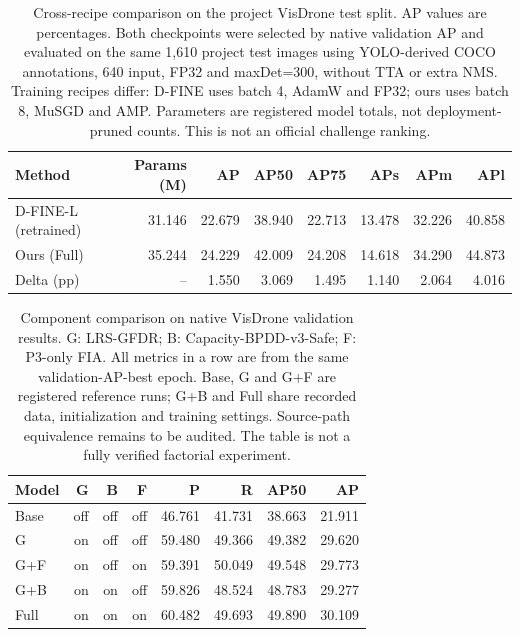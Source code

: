 
\begin{table}[t]
\centering
\small
\caption{Cross-recipe comparison on the project VisDrone test split. AP values are percentages. Both checkpoints were selected by native validation AP and evaluated on the same 1,610 project test images using YOLO-derived COCO annotations, 640 input, FP32 and maxDet=300, without TTA or extra NMS. Training recipes differ: D-FINE uses batch 4, AdamW and FP32; ours uses batch 8, MuSGD and AMP. Parameters are registered model totals, not deployment-pruned counts. This is not an official challenge ranking.}
\label{tab:t1}
\begin{tabular}{lrrrrrrr}
\toprule
Method & Params (M) & AP & AP50 & AP75 & APs & APm & APl \\
\midrule
D-FINE-L (retrained) & 31.146 & 22.679 & 38.940 & 22.713 & 13.478 & 32.226 & 40.858 \\
Ours (Full) & 35.244 & 24.229 & 42.009 & 24.208 & 14.618 & 34.290 & 44.873 \\
Delta (pp) & -- & 1.550 & 3.069 & 1.495 & 1.140 & 2.064 & 4.016 \\
\bottomrule
\end{tabular}
\end{table}

\begin{table}[t]
\centering
\small
\caption{Component comparison on native VisDrone validation results. G: LRS-GFDR; B: Capacity-BPDD-v3-Safe; F: P3-only FIA. All metrics in a row are from the same validation-AP-best epoch. Base, G and G+F are registered reference runs; G+B and Full share recorded data, initialization and training settings. Source-path equivalence remains to be audited. The table is not a fully verified factorial experiment.}
\label{tab:t2}
\begin{tabular}{lrrrrrrr}
\toprule
Model & G & B & F & P & R & AP50 & AP \\
\midrule
Base & off & off & off & 46.761 & 41.731 & 38.663 & 21.911 \\
G & on & off & off & 59.480 & 49.366 & 49.382 & 29.620 \\
G+F & on & off & on & 59.391 & 50.049 & 49.548 & 29.773 \\
G+B & on & on & off & 59.826 & 48.524 & 48.783 & 29.277 \\
Full & on & on & on & 60.482 & 49.693 & 49.890 & 30.109 \\
\bottomrule
\end{tabular}
\end{table}


